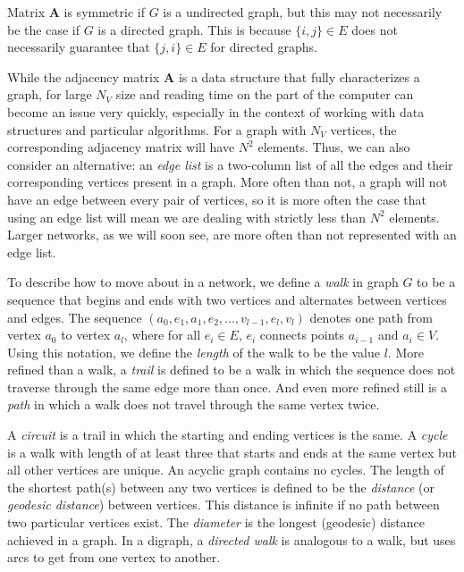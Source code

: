 \documentclass[12pt,twoside]{amherstthesis}
\begin{document}
  Matrix \(\textbf{A}\) is symmetric if \(G\) is a undirected graph, but
  this may not necessarily be the case if \(G\) is a directed graph. This
  is because \(\{i, j\} \in E\) does not necessarily guarantee that
  \(\{j, i\} \in E\) for directed graphs.
  
  While the adjacency matrix \(\textbf{A}\) is a data structure that fully
  characterizes a graph, for large \(N_{V}\) size and reading time on the
  part of the computer can become an issue very quickly, especially in the
  context of working with data structures and particular algorithms. For a
  graph with \(N_{V}\) vertices, the corresponding adjacency matrix will
  have \(N^2\) elements. Thus, we can also consider an alternative: an
  \emph{edge list} is a two-column list of all the edges and their
  corresponding vertices present in a graph. More often than not, a graph
  will not have an edge between every pair of vertices, so it is more
  often the case that using an edge list will mean we are dealing with
  strictly less than \(N^2\) elements. Larger networks, as we will soon
  see, are more often than not represented with an edge list.
  
  To describe how to move about in a network, we define a \emph{walk} in
  graph \(G\) to be a sequence that begins and ends with two vertices and
  alternates between vertices and edges. The sequence
  \((a_0, e_1, a_1, e_2, ..., v_{l-1}, e_l, v_l)\) denotes one path from
  vertex \(a_0\) to vertex \(a_l\), where for all \(e_i \in E\), \(e_i\)
  connects points \(a_{i-1}\) and \(a_i \in V\). Using this notation, we
  define the \emph{length} of the walk to be the value \(l\). More refined
  than a walk, a \emph{trail} is defined to be a walk in which the
  sequence does not traverse through the same edge more than once. And
  even more refined still is a \emph{path} in which a walk does not travel
  through the same vertex twice.
  
  A \emph{circuit} is a trail in which the starting and ending vertices is
  the same. A \emph{cycle} is a walk with length of at least three that
  starts and ends at the same vertex but all other vertices are unique. An
  acyclic graph contains no cycles. The length of the shortest path(s)
  between any two vertices is defined to be the \emph{distance} (or
  \emph{geodesic distance}) between vertices. This distance is infinite if
  no path between two particular vertices exist. The \emph{diameter} is
  the longest (geodesic) distance achieved in a graph. In a digraph, a
  \emph{directed walk} is analogous to a walk, but uses arcs to get from
  one vertex to another.
  
\end{document}
